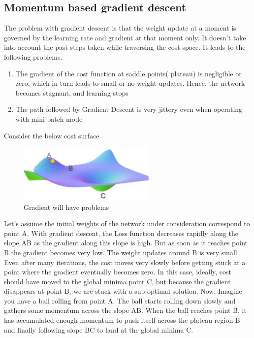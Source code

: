 \subsection{Momentum based gradient descent}
The problem with gradient descent is that the weight update at a moment is governed by the
learning rate and gradient at that moment only. 
It doesn’t take into account the past steps taken while traversing the cost space.
It leads to the following problems.
\begin{enumerate}
	\item The gradient of the cost function at saddle points( plateau) is negligible or zero,
		which in turn leads to small or no weight updates. 
		Hence, the network becomes stagnant, and learning stops
    \item The path followed by Gradient Descent is very jittery even when 
		operating with mini-batch mode
\end{enumerate}
Consider the below cost surface.
\begin{figure}[htb] 
	\label{fig:gradient_problem}
	\centering
	\includegraphics[width=0.6\textwidth]{figures/gradient_problem}
	\caption{Gradient will have problems}
\end{figure}
Let’s assume the initial weights of the network under consideration correspond to point A. 
With gradient descent, the Loss function decreases rapidly along the slope AB as the gradient
along this slope is high.
But as soon as it reaches point B the gradient becomes very low. The weight updates around B 
is very small. Even after many iterations, the cost moves very slowly before getting stuck at a
point where the gradient eventually becomes zero.
In this case, ideally, cost should have moved to the global minima point C,
but because the gradient disappears at point B, we are stuck with a sub-optimal solution.
Now, Imagine you have a ball rolling from point A. The ball starts rolling down slowly and gathers
some momentum across the slope AB. 
When the ball reaches point B, it has accumulated enough momentum to push itself across the
plateau region B and finally following slope BC to land at the global minima C.
